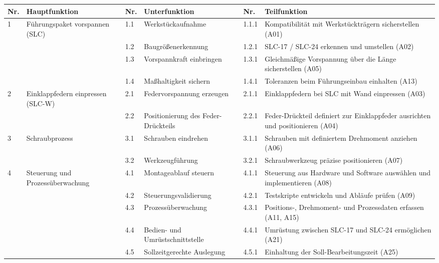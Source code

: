 {
\small
\setlength{\tabcolsep}{6pt}
\renewcommand{\arraystretch}{1.2}

\begin{longtable}{|p{0.5cm}|p{2.5cm}|p{0.6cm}|p{3.5cm}|p{0.8cm}|p{5.0cm}|}
\hline
\textbf{Nr.} & \textbf{Hauptfunktion} &
\textbf{Nr.} & \textbf{Unterfunktion} &
\textbf{Nr.} & \textbf{Teilfunktion} \\
\hline
\endfirsthead
\endhead
\hline
\endfoot
\endlastfoot

1 & Führungspaket vorspannen (SLC) & 1.1 & Werkstückaufnahme &
1.1.1 & Kompatibilität mit Werkstückträgern sicherstellen (A01) \\
\cline{3-6}
  &  & 1.2 & Baugrößenerkennung &
1.2.1 & SLC-17 / SLC-24 erkennen und umstellen (A02) \\
\cline{3-6}
  &  & 1.3 & Vorspannkraft einbringen &
1.3.1 & Gleichmäßige Vorspannung über die Länge sicherstellen (A05) \\
\cline{3-6}
  &  & 1.4 & Maßhaltigkeit sichern &
1.4.1 & Toleranzen beim Führungseinbau einhalten (A13) \\
\hline

2 & Einklappfedern einpressen (SLC-W) & 2.1 & Federvorspannung erzeugen &
2.1.1 & Einklappfedern bei SLC mit Wand einpressen (A03) \\
\cline{3-6}
  &  & 2.2 & Positionierung des Feder-Drückteils &
2.2.1 & Feder-Drückteil definiert zur Einklappfeder ausrichten und positionieren (A04) \\
\hline

3 & Schraubprozess & 3.1 & Schrauben eindrehen &
3.1.1 & Schrauben mit definiertem Drehmoment anziehen (A06) \\
\cline{3-6}
  &  & 3.2 & Werkzeugführung &
3.2.1 & Schraubwerkzeug präzise positionieren (A07) \\
\hline

4 & Steuerung und Prozessüberwachung & 4.1 & Montageablauf steuern &
4.1.1 & Steuerung aus Hardware und Software auswählen und implementieren (A08) \\
\cline{3-6}
  &  & 4.2 & Steuerungsvalidierung &
4.2.1 & Testskripte entwickeln und Abläufe prüfen (A09) \\
\cline{3-6}
  &  & 4.3 & Prozessüberwachung &
4.3.1 & Positions-, Drehmoment- und Prozessdaten erfassen (A11, A15) \\
\cline{3-6}
  &  & 4.4 & Bedien- und Umrüstschnittstelle &
4.4.1 & Umrüstung zwischen SLC-17 und SLC-24 ermöglichen (A21) \\
\cline{3-6}
  &  & 4.5 & Sollzeitgerechte Auslegung &
4.5.1 & Einhaltung der Soll-Bearbeitungszeit (A25) \\
\hline


\end{longtable}}

